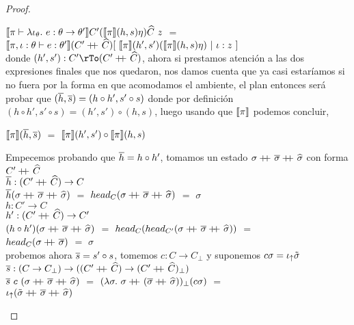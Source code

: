\begin{proof}
\begin{itemize}
\begin{itemize}
$\llbracket \pi \vdash \lambda \iota_{\theta} . \ e : \theta \rightarrow \theta' \rrbracket
		C'(\llbracket \pi \rrbracket(h,s)\eta)\widehat{C} \ z$ $=$\\
$\semBrcks{\pi,\iota:\theta \vdash e : \theta'}(C' \concat \Chat)
			[ \ \semBrcks{\pi}(h',s')(\semBrcks{\pi}(h,s)\eta) \ | \ \iota:z \ ]$\\

donde $(h',s') : C' \rTo (C' \concat \Chat)$,
ahora si prestamos atenci\'on a las dos expresiones finales que nos quedaron, nos 
damos cuenta que ya casi estar\'iamos si no fuera por la forma en que acomodamos
el ambiente, el plan entonces ser\'a probar que $(\overline{h},\overline{s}) = (h \circ h',s'\circ s)$
donde por definici\'on $(h \circ h',s'\circ s) = (h',s') \circ (h,s)$, luego usando
que $\llbracket \pi \rrbracket$ podemos concluir,

\begin{center}
$\llbracket \pi \rrbracket(\overline{h},\overline{s})$ $=$ $\llbracket \pi \rrbracket(h',s') \circ \llbracket \pi \rrbracket(h,s)$
\end{center}

Empecemos probando que $\overline{h} = h \circ h'$, tomamos un estado 
$\sigma +\kern-1.3ex+\kern0.8ex \overline{\sigma} +\kern-1.3ex+\kern0.8ex \widehat{\sigma}$ con forma $C' +\kern-1.3ex+\kern0.8ex \widehat{C}$\\

$\overline{h} : (C' +\kern-1.3ex+\kern0.8ex \widehat{C}) \rightarrow C$\\
$\overline{h} (\sigma +\kern-1.3ex+\kern0.8ex \overline{\sigma} +\kern-1.3ex+\kern0.8ex \widehat{\sigma})$ $=$ 
$head_{C} (\sigma +\kern-1.3ex+\kern0.8ex \overline{\sigma} +\kern-1.3ex+\kern0.8ex \widehat{\sigma})$ $=$ $\sigma$\\

$h : C' \rightarrow C$\\
$h' : (C' +\kern-1.3ex+\kern0.8ex \widehat{C}) \rightarrow C'$\\
$(h \circ h') (\sigma +\kern-1.3ex+\kern0.8ex \overline{\sigma} +\kern-1.3ex+\kern0.8ex \widehat{\sigma})$ $=$
$head_{C}(head_{C'} (\sigma +\kern-1.3ex+\kern0.8ex \overline{\sigma} +\kern-1.3ex+\kern0.8ex \widehat{\sigma}))$ $=$\\
$head_{C}(\sigma +\kern-1.3ex+\kern0.8ex \overline{\sigma})$ $=$ $\sigma$\\

probemos ahora $\overline{s} = s' \circ s$, tomemos $c : C \rightarrow C_\bot$ y
suponemos $c \sigma = \iota_{\uparrow} \tilde{\sigma}$\\

$\overline{s} : (C \rightarrow C_\bot) \rightarrow 
		  ((C' +\kern-1.3ex+\kern0.8ex \widehat{C}) \rightarrow (C' +\kern-1.3ex+\kern0.8ex \widehat{C})_\bot)$\\
$\overline{s} \ c \ (\sigma +\kern-1.3ex+\kern0.8ex \overline{\sigma} +\kern-1.3ex+\kern0.8ex \widehat{\sigma})$ $=$
$(\lambda \sigma . \ 
	\sigma \concat (\sigmaover \concat \sigmahat))_{\bot} (c \sigma)$ $=$\\
$\iota_{\uparrow} (\tilde{\sigma} +\kern-1.3ex+\kern0.8ex \overline{\sigma} +\kern-1.3ex+\kern0.8ex \widehat{\sigma})$\\


\end{itemize}
\end{itemize}
\end{proof}
